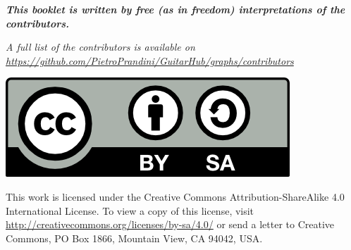 \begin{center}
	{\textit{\textbf{This booklet is written by free (as in freedom) interpretations of the contributors.}}}\par
\end{center}
\begin{center}
	{\textit{\footnotesize{A full list of the contributors is available on \href{https://github.com/PietroPrandini/GuitarHub/graphs/contributors}{https://github.com/PietroPrandini/GuitarHub/graphs/contributors}}}}\par
\medskip
{}
\end{center}
\begin{center}
	\includegraphics[scale=0.5]{img/cc-by-sa_88x31} \par
	{\footnotesize{This work is licensed under the Creative Commons Attribution-ShareAlike 4.0 International License. To view a copy of this license, visit \href{http://creativecommons.org/licenses/by-sa/4.0/}{http://creativecommons.org/licenses/by-sa/4.0/} or send a letter to Creative Commons, PO Box 1866, Mountain View, CA 94042, USA.}}\par
\medskip
{}
\end{center}
\newpage
